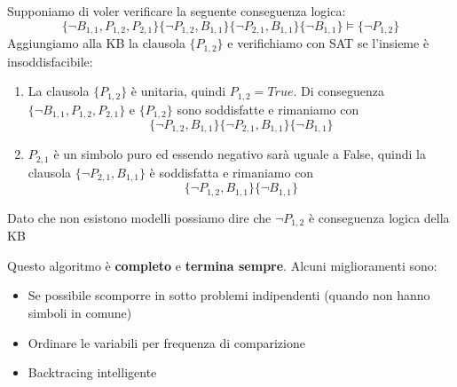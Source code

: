 \begin{example}
	Supponiamo di voler verificare la seguente conseguenza logica:
	\begin{equation*}
		\{\neg B_{1,1}, P_{1,2}, P_{2,1}\}\{\neg P_{1,2}, B_{1,1}\}\{\neg P_{2,1}, B_{1,1}\}\{\neg B_{1,1}\} \models \{\neg P_{1,2}\}
	\end{equation*}
	Aggiungiamo alla KB la clausola $\{P_{1,2}\}$ e verifichiamo con SAT se l'insieme è insoddisfacibile:
	\begin{enumerate}
		\item La clausola $\{P_{1,2}\}$ è unitaria, quindi $P_{1,2}=True$. Di conseguenza $\{\neg B_{1,1}, P_{1,2}, P_{2,1}\}$ e $\{P_{1,2}\}$ sono soddisfatte e rimaniamo con
		\begin{equation*}
			\{\neg P_{1,2}, B_{1,1}\}\{\neg P_{2,1}, B_{1,1}\}\{\neg B_{1,1}\}
		\end{equation*}
		\item $P_{2,1}$ è un simbolo puro ed essendo negativo sarà uguale a False, quindi la clausola $\{\neg P_{2,1}, B_{1,1}\}$ è soddisfatta e rimaniamo con
		\begin{equation*}
			\{\neg P_{1,2}, B_{1,1}\}\{\neg B_{1,1}\}
		\end{equation*}
	\end{enumerate}
	Dato che non esistono modelli possiamo dire che $\neg P_{1,2}$ è conseguenza logica della KB
\end{example}
Questo algoritmo è \textbf{completo} e \textbf{termina sempre}. Alcuni miglioramenti sono:
\begin{itemize}
	\item Se possibile scomporre in sotto problemi indipendenti (quando non hanno simboli in comune)
	\item Ordinare le variabili per frequenza di comparizione
	\item Backtracing intelligente
\end{itemize}